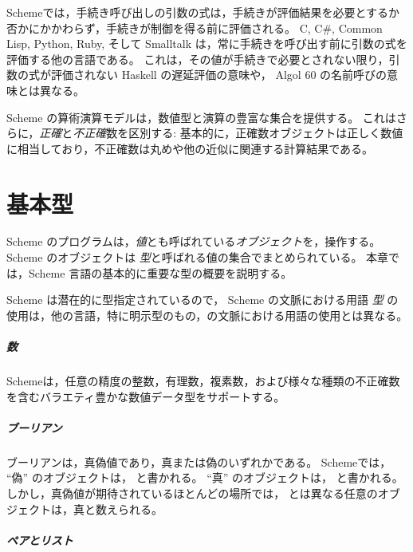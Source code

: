 Schemeでは，手続き呼び出しの引数の式は，手続きが評価結果を​​必要とするか否かにかかわらず，手続きが制御を得る前に評価される。
C, C\#, Common Lisp, Python, Ruby, そして Smalltalk は，常に手続きを呼び出す前に引数の式を評価する他の言語である。
これは，その値が手続きで必要とされない限り，引数の式が評価されない Haskell の遅延評価の意味や， Algol 60 の名前呼びの意味とは異なる。

Scheme の算術演算モデルは，数値型と演算の豊富な集合を提供する。
これはさらに，\textit{正確}と\textit{不正確}数を区別する: 
基本的に，正確数オブジェクトは正しく数値に相当しており，不正確数は丸めや他の近似に関連する計算結果である。

\chapter{基本型}

Scheme のプログラムは，\textit{値}とも呼ばれている\textit{オブジェクト}を，操作する。
Scheme のオブジェクトは \textit{型}と呼ばれる値の集合でまとめられている。
本章では，Scheme 言語の基本的に重要な型の概要を説明する。

\begin{note}
  Scheme は潜在的に型指定されているので， Scheme の文脈における用語 \textit{型} の使用は，他の言語，特に明示型のもの，の文脈における用語の使用とは異なる。
\end{note}

\paragraph{数}

Schemeは，任意の精度の整数，有理数，複素数，および様々な種類の不正確数を含むバラエティ豊かな数値データ型をサポートする。

\paragraph{ブーリアン}

ブーリアンは，真偽値であり，真または偽のいずれかである。
Schemeでは， ``偽'' のオブジェクトは， \schfalse{} と書かれる。
``真'' のオブジェクトは， \schtrue{} と書かれる。
しかし，真偽値が期待されているほとんどの場所では，\schfalse{} とは異なる任意のオブジェクトは，真と数えられる。

\paragraph{ペアとリスト}

